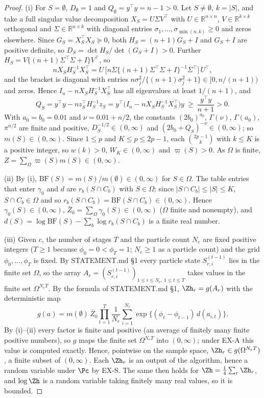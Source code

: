 \documentclass[11pt]{report}
\begin{document}
\begin{proof}
(i) For $S=\emptyset$, $D_\emptyset=1$ and $Q_\emptyset=y^\top y=n-1>0$. Let $S\neq\emptyset$, $k=|S|$, and take a full
singular value decomposition $X_S=U\Sigma V^\top$ with $U\in\mathbb{R}^{n\times n}$, $V\in\mathbb{R}^{k\times k}$ orthogonal
and $\Sigma\in\mathbb{R}^{n\times k}$ with diagonal entries $\sigma_1,\dots,\sigma_{\min(n,k)}\ge0$ and zeros elsewhere.
Since $G_S=X_S^\top X_S\succeq0$, both $H_S=(n+1)G_S+I$ and $G_S+I$ are positive definite, so $D_S=\det H_S/\det(G_S+I)>0$.
Further $H_S=V\{(n+1)\Sigma^\top\Sigma+I\}V^\top$, so
\[
nX_SH_S^{-1}X_S^\top=U\,\bigl[n\Sigma\{(n+1)\Sigma^\top\Sigma+I\}^{-1}\Sigma^\top\bigr]\,U^\top,
\]
and the bracket is diagonal with entries $n\sigma_j^2/\{(n+1)\sigma_j^2+1\}\in[0,n/(n+1))$ and zeros. Hence
$I_n-nX_SH_S^{-1}X_S^\top$ has all eigenvalues at least $1/(n+1)$, and
\[
Q_S=y^\top y-nz_S^\top H_S^{-1}z_S=y^\top\bigl(I_n-nX_SH_S^{-1}X_S^\top\bigr)y\ \ge\ \frac{y^\top y}{n+1}>0 .
\]
With $a_0=b_0=0.01$ and $\nu=0.01+n/2$, the constants $(2b_0)^{a_0}$, $\Gamma(\nu)$, $\Gamma(a_0)$, $\pi^{n/2}$ are finite and
positive, $D_S^{-1/2}\in(0,\infty)$ and $(2b_0+Q_S)^{-\nu}\in(0,\infty)$; so $m(S)\in(0,\infty)$. Since $1\le p$ and
$K\le p\le 2p-1$, each $\binom{2p-1}{k}$ with $k\le K$ is a positive integer, so $w(k)>0$, $W_K\in(0,\infty)$ and
$\varpi(S)>0$. As $\Omega$ is finite, $Z=\sum_\Omega\varpi(S)m(S)\in(0,\infty)$.

(ii) By (i), $\mathrm{BF}(S)=m(S)/m(\emptyset)\in(0,\infty)$ for $S\in\Omega$. The table entries that enter $\gamma_0$
and $d$ are $r_b(S\cap C_b)$ with $S\in\Omega$; since $|S\cap C_b|\le|S|\le K$, $S\cap C_b\in\Omega$ and so
$r_b(S\cap C_b)=\mathrm{BF}(S\cap C_b)\in(0,\infty)$. Hence $\gamma_0(S)\in(0,\infty)$, $\bar Z_0=\sum_\Omega\gamma_0(S)\in(0,\infty)$ ($\Omega$ finite and
nonempty), and $d(S)=\log\mathrm{BF}(S)-\sum_b\log r_b(S\cap C_b)$ is a finite real number.

(iii) Given $c$, the number of stages $T$ and the particle count $N_e$ are fixed positive integers ($T\ge1$ because
$\phi_0=0<\phi_T=1$; $N_e\ge1$ as a particle count) and the grid $\phi_0,\dots,\phi_T$ is fixed. By STATEMENT.md \S1 every
particle state $S_{r,i}^{(t-1)}$ lies in the finite set $\Omega$, so the array
$A_r=(S_{r,i}^{(t-1)})_{1\le i\le N_e,\,1\le t\le T}$ takes values in the finite set $\Omega^{N_eT}$. By the formula of
STATEMENT.md \S1, $\Zh_r=g(A_r)$ with the deterministic map
\[
g(a)=m(\emptyset)\,\bar Z_0\prod_{t=1}^T\frac1{N_e}\sum_{i=1}^{N_e}\exp\{(\phi_t-\phi_{t-1})\,d(a_{i,t})\}.
\]
By (i)--(ii) every factor is finite and positive (an average of finitely many finite positive numbers), so $g$ maps the
finite set $\Omega^{N_eT}$ into $(0,\infty)$; under EX-A this value is computed exactly. Hence, pointwise on the sample
space, $\Zh_r\in g(\Omega^{N_eT})$, a finite subset of $(0,\infty)$. Each $\Zh_r$ is an output of the algorithm, hence a
random variable under $\Pc$ by EX-S. The same then holds for $\Zh=\frac14\sum_r\Zh_r$, and $\log\Zh$ is a random
variable taking finitely many real values, so it is bounded.
\end{proof}
\end{document}
